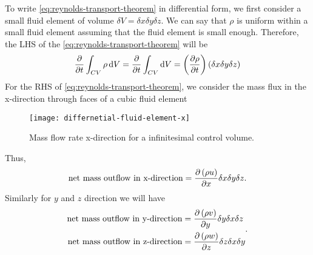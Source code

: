 To write \cref{eq:reynolds-transport-theorem} in differential form, we first consider a small fluid element of volume \(\delta V = \delta x \delta y \delta z\). We can say that \(\rho\) is uniform within a small fluid element assuming that the fluid element is small enough. Therefore, the LHS of the \cref{eq:reynolds-transport-theorem} will be
%
\begin{equation}
  \frac{\partial}{\partial t} \int_{CV}{\rho \mathop{}\!\mathrm{d} V}
  = \frac{\partial}{\partial t} \int_{CV}{\mathop{}\!\mathrm{d} V}
  = \left(\frac{\partial\rho}{\partial t}\right) \left(\delta x \delta y \delta z\right)
\end{equation}
%
For the RHS of \cref{eq:reynolds-transport-theorem}, we consider the mass flux in the x-direction through faces of a cubic fluid element
%
\begin{figure}
  \begin{center}
    \texttt{[image: differnetial-fluid-element-x]}
  \end{center}
  \caption{Mass flow rate x-direction for a infinitesimal control volume.}\label{fig:fluid-element-mass-flow-rate-x-direction}
\end{figure}
%
Thus,
%
\begin{equation}
  \text{net mass outflow in x-direction} = \frac{\partial \left(\rho u\right)}{\partial x} \delta x \delta y \delta z
  \label{eq:net-mass-outflow-x}.
\end{equation}
%
Similarly for \(y\) and \(z\) direction we will have
%
\begin{equation}
\begin{aligned}
  \text{net mass outflow in y-direction} &= \frac{\partial \left(\rho v\right)}{\partial y} \delta y \delta x \delta z \\
  \text{net mass outflow in z-direction} &= \frac{\partial \left(\rho w\right)}{\partial z} \delta z \delta x \delta y
\end{aligned}
  \label{eq:net-mass-outflow-y-z}.
\end{equation}

